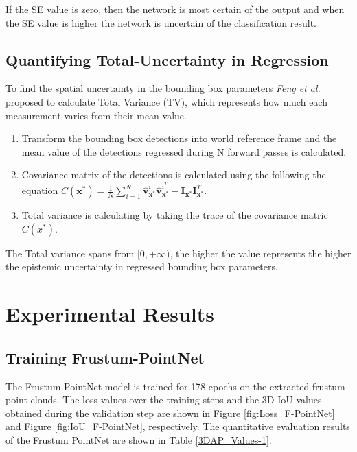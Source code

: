 \documentclass[10pt,twocolumn,letterpaper]{article}
\begin{document}
        If the SE value is zero, then the network is most certain of the output and when the SE value is higher the network is uncertain of the classification result.
        
         \subsection{Quantifying Total-Uncertainty in Regression}
         \label{uncertainty in bounding box regression}
         To find the spatial uncertainty in the bounding box parameters \textit{Feng et al.} \cite{Feng2018} proposed to calculate Total Variance (TV), which represents how much each measurement varies from their mean value.
         
         \begin{enumerate}
             \item Transform the bounding box detections into world reference frame and the mean value of the detections regressed during N forward passes is calculated.
             \item Covariance matrix of the detections is calculated using the following the equation $C\left(\mathbf{x}^{*}\right)=\frac{1}{N} \sum_{i=1}^{N} \hat{\mathbf{v}}_{\mathbf{x}^{*}}^{i} \hat{\mathbf{v}}_{\mathbf{x}^{*}}^{i^{T}}-\mathbf{I}_{\mathbf{x}^{*}} \mathbf{I}_{\mathbf{x}^{*}}^{T}$.
             \item Total variance is calculating by taking the trace of the covariance matric $C(x^{*})$.
         \end{enumerate}
         
         The Total variance spans from $[0,+\infty)$, the higher the value represents the higher the epistemic uncertainty in regressed bounding box parameters.
\section{Experimental Results}
\subsection{Training Frustum-PointNet }
The Frustum-PointNet model is trained for 178 epochs on the extracted frustum point clouds. The loss values over the training steps and the 3D IoU values obtained during the validation step are shown in Figure \ref{fig:Loss_F-PointNet} and Figure \ref{fig:IoU_F-PointNet}, respectively. The quantitative evaluation results of the Frustum PointNet are shown in Table \ref{3DAP_Values-1}.
\end{document}
